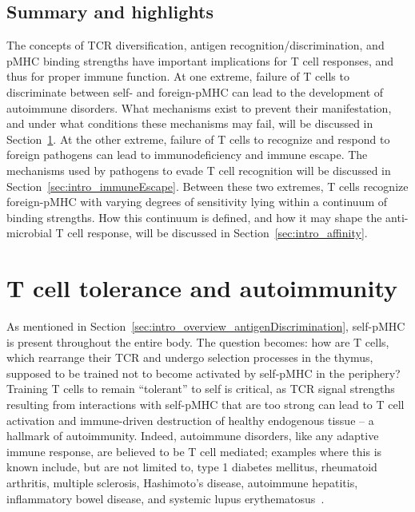 \subsection{Summary and highlights}

The concepts of TCR diversification, antigen recognition/discrimination, and pMHC binding strengths have important implications for T cell responses, and thus for proper immune function. At one extreme, failure of T cells to discriminate between self- and foreign-pMHC can lead to the development of autoimmune disorders. What mechanisms exist to prevent their manifestation, and under what conditions these mechanisms may fail, will be discussed in Section~\ref{sec:intro_autoimmunity}. At the other extreme, failure of T cells to recognize and respond to foreign pathogens can lead to immunodeficiency and immune escape. The mechanisms used by pathogens to evade T cell recognition will be discussed in Section~\ref{sec:intro_immuneEscape}. Between these two extremes, T cells recognize foreign-pMHC with varying degrees of sensitivity lying within a continuum of binding strengths. How this continuum is defined, and how it may shape the anti-microbial T cell response, will be discussed in Section~\ref{sec:intro_affinity}.


\section{T cell tolerance and autoimmunity}
\label{sec:intro_autoimmunity}

As mentioned in Section~\ref{sec:intro_overview_antigenDiscrimination}, self-pMHC is present throughout the entire body. The question becomes: how are T cells, which rearrange their TCR and undergo selection processes in the thymus, supposed to be trained not to become activated by self-pMHC in the periphery? Training T cells to remain ``tolerant'' to self is critical, as TCR signal strengths resulting from interactions with self-pMHC that are too strong can lead to T cell activation and immune-driven destruction of healthy endogenous tissue --  a hallmark of autoimmunity. Indeed, autoimmune disorders, like any adaptive immune response, are believed to be T cell mediated; examples where this is known include, but are not limited to, type 1 diabetes mellitus, rheumatoid arthritis, multiple sclerosis, Hashimoto's disease, autoimmune hepatitis, inflammatory bowel disease, and systemic lupus erythematosus~\cite{giwa2020current,weyand2020immunometabolism,liu2022autoreactive,chistiakov2005immunogenetics,sirbe2021pathogenesis,imam2018effector,sharabi2020t}.

